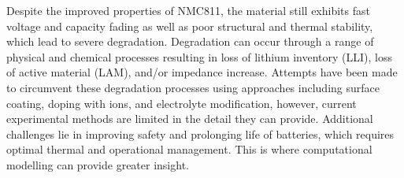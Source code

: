 \documentclass[journal=jacsat,manuscript=article]{achemso}
\begin{document}
Despite the improved properties of NMC811, the material still exhibits fast voltage and capacity fading as well as poor structural and thermal stability\cite{noh2013comparison,Li-aenm-2019,Jerng-ACS-AMI-2020}, which lead to severe degradation. \cite{Zhang-acs.chemmater-2019,Feng-2019,Xia2018,De-AdMat-2019,Li_Nat-Comm-2017,Manthiram-NatComm-2020} Degradation can occur through a range of physical and chemical processes resulting in loss of lithium inventory (LLI), loss of active material (LAM), and/or impedance increase.\cite{vetter2005ageing} Attempts have been made to circumvent these degradation processes using approaches including surface coating, doping with ions, and electrolyte modification,\cite{Liu-JSSE-2020} however, current experimental methods are limited in the detail they can provide. Additional challenges lie in improving safety and prolonging life of batteries, which requires optimal thermal and operational management. This is where computational modelling can provide greater insight.

\end{document}
